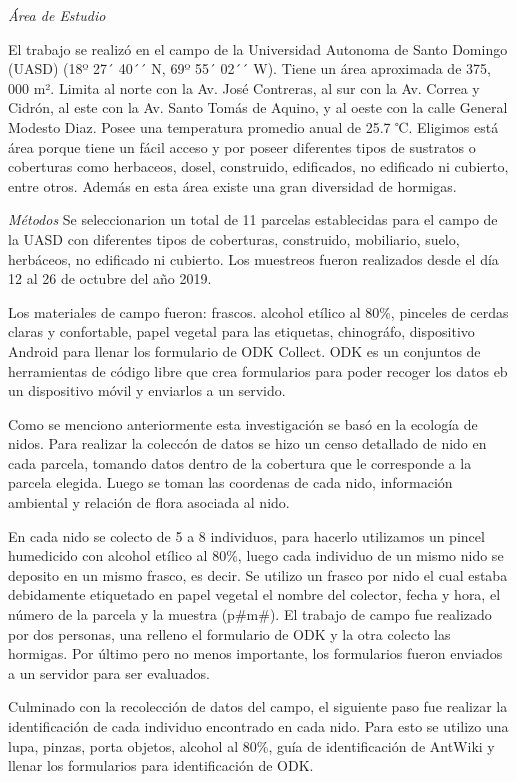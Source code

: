 \documentclass[11pt,]{article}
\begin{document}
\emph{Área de Estudio}

El trabajo se realizó en el campo de la Universidad Autonoma de Santo
Domingo (UASD) (18º 27´ 40´´ N, 69º 55´ 02´´ W). Tiene un área
aproximada de 375, 000 m². Limita al norte con la Av. José Contreras, al
sur con la Av. Correa y Cidrón, al este con la Av. Santo Tomás de
Aquino, y al oeste con la calle General Modesto Diaz. Posee una
temperatura promedio anual de 25.7 ℃. Eligimos está área porque tiene un
fácil acceso y por poseer diferentes tipos de sustratos o coberturas
como herbaceos, dosel, construido, edificados, no edificado ni cubierto,
entre otros. Además en esta área existe una gran diversidad de hormigas.

\emph{Métodos} Se seleccionarion un total de 11 parcelas establecidas
para el campo de la UASD con diferentes tipos de coberturas, construido,
mobiliario, suelo, herbáceos, no edificado ni cubierto. Los muestreos
fueron realizados desde el día 12 al 26 de octubre del año 2019.

Los materiales de campo fueron: frascos. alcohol etílico al 80\%,
pinceles de cerdas claras y confortable, papel vegetal para las
etiquetas, chinográfo, dispositivo Android para llenar los formulario de
ODK Collect. ODK es un conjuntos de herramientas de código libre que
crea formularios para poder recoger los datos eb un dispositivo móvil y
enviarlos a un servido.

Como se menciono anteriormente esta investigación se basó en la ecología
de nidos. Para realizar la coleccón de datos se hizo un censo detallado
de nido en cada parcela, tomando datos dentro de la cobertura que le
corresponde a la parcela elegida. Luego se toman las coordenas de cada
nido, información ambiental y relación de flora asociada al nido.

En cada nido se colecto de 5 a 8 individuos, para hacerlo utilizamos un
pincel humedicido con alcohol etílico al 80\%, luego cada individuo de
un mismo nido se deposito en un mismo frasco, es decir. Se utilizo un
frasco por nido el cual estaba debidamente etiquetado en papel vegetal
el nombre del colector, fecha y hora, el número de la parcela y la
muestra (p\#m\#). El trabajo de campo fue realizado por dos personas,
una relleno el formulario de ODK y la otra colecto las hormigas. Por
último pero no menos importante, los formularios fueron enviados a un
servidor para ser evaluados.

Culminado con la recolección de datos del campo, el siguiente paso fue
realizar la identificación de cada individuo encontrado en cada nido.
Para esto se utilizo una lupa, pinzas, porta objetos, alcohol al 80\%,
guía de identificación de AntWiki y llenar los formularios para
identificación de ODK.
\end{document}
